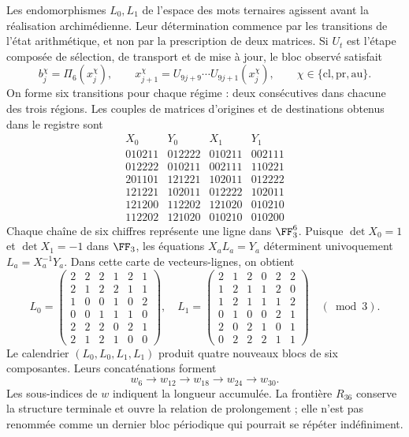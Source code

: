 Les endomorphismes \(L_0,L_1\) de l'espace des mots ternaires agissent avant la réalisation archimédienne. Leur détermination commence par les transitions de l'état arithmétique, et non par la prescription de deux matrices. Si \(U_t\) est l'étape composée de sélection, de transport et de mise à jour, le bloc observé satisfait
\[
 b_j^\chi=\Pi_6(x_j^\chi),\qquad
 x_{j+1}^\chi=U_{9j+9}\cdots U_{9j+1}(x_j^\chi),
 \qquad \chi\in\{\mathrm{cl},\mathrm{pr},\mathrm{au}\}.
\]
On forme six transitions pour chaque régime : deux consécutives dans chacune des trois régions. Les couples de matrices d'origines et de destinations obtenus dans le registre sont
\[
\begin{array}{c|c|c|c}
X_0&Y_0&X_1&Y_1\\\hline
010211&012222&010211&002111\\
012222&010211&002111&110221\\
201101&121221&102011&012222\\
121221&102011&012222&102011\\
121200&112202&121020&010210\\
112202&121020&010210&010200
\end{array}
\]
Chaque chaîne de six chiffres représente une ligne dans \(\FF_3^6\). Puisque \(\det X_0=1\) et \(\det X_1=-1\) dans \(\FF_3\), les équations \(X_aL_a=Y_a\) déterminent univoquement \(L_a=X_a^{-1}Y_a\). Dans cette carte de vecteurs-lignes, on obtient
\[
 L_0=\begin{pmatrix}
 2&2&2&1&2&1\\2&1&2&2&1&1\\1&0&0&1&0&2\\
 0&0&1&1&1&0\\2&2&2&0&2&1\\2&1&2&1&0&0
 \end{pmatrix},\quad
 L_1=\begin{pmatrix}
 2&1&2&0&2&2\\1&2&1&1&2&0\\1&2&1&1&1&2\\
 0&1&0&0&2&1\\2&0&2&1&0&1\\0&2&2&2&1&1
 \end{pmatrix}\quad(\bmod3).
\]
Le calendrier \((L_0,L_0,L_1,L_1)\) produit quatre nouveaux blocs de six composantes. Leurs concaténations forment
\[
 w_6\longrightarrow w_{12}\longrightarrow w_{18}
 \longrightarrow w_{24}\longrightarrow w_{30}.
\]
Les sous-indices de \(w\) indiquent la longueur accumulée. La frontière \(R_{36}\) conserve la structure terminale et ouvre la relation de prolongement ; elle n'est pas renommée comme un dernier bloc périodique qui pourrait se répéter indéfiniment.

